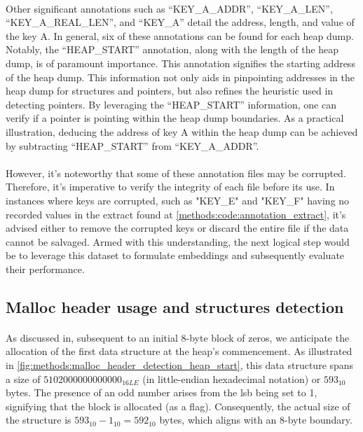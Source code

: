        \paragraph{}Other significant annotations such as ``KEY\_A\_ADDR'', ``KEY\_A\_LEN'', ``KEY\_A\_REAL\_LEN'', and ``KEY\_A'' detail the address, length, and value of the key A. In general, six of these annotations can be found for each heap dump. Notably, the ``HEAP\_START'' annotation, along with the length of the heap dump, is of paramount importance. This annotation signifies the starting address of the heap dump. This information not only aids in pinpointing addresses in the heap dump for \glspl{structure} and \glspl{pointer}, but also refines the heuristic used in detecting \glspl{pointer}. By leveraging the ``HEAP\_START'' information, one can verify if a \gls{pointer} is pointing within the heap dump boundaries. As a practical illustration, deducing the address of key A within the heap dump can be achieved by subtracting ``HEAP\_START'' from ``KEY\_A\_ADDR''.

        \paragraph{}However, it's noteworthy that some of these annotation files may be corrupted. Therefore, it's imperative to verify the integrity of each file before its use. In instances where keys are corrupted, such as "KEY\_E" and "KEY\_F" having no recorded values in the extract found at \ref{methods:code:annotation_extract}, it's advised either to remove the corrupted keys or discard the entire file if the data cannot be salvaged. Armed with this understanding, the next logical step would be to leverage this dataset to formulate embeddings and subsequently evaluate their performance.

    \subsection{Malloc header usage and structures detection}
        \paragraph{}As discussed in, subsequent to an initial 8-byte block of zeros, we anticipate the allocation of the first data structure at the heap's commencement. As illustrated in \ref{fig:methods:malloc_header_detection_heap_start}, this data structure spans a size of $ 5102000000000000_{16LE} $ (in little-endian hexadecimal notation) or $ 593_{10} $ bytes. The presence of an odd number arises from the \acrshort{lsb} being set to 1, signifying that the block is allocated (as a flag). Consequently, the actual size of the structure is $ 593_{10} - 1_{10} = 592_{10} $ bytes, which aligns with an 8-byte boundary.

